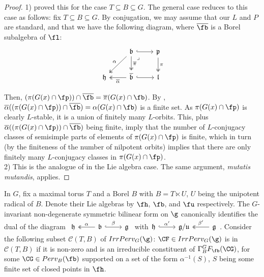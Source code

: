\begin{proof}
    1) \cite[]{mirkovic_character_2004} proved this for the case $T\subseteq B\subseteq G$. The general case reduces to this case as follows: fix $T\subseteq B\subseteq G$. By conjugation, we may assume that our $L$ and $P$ are standard, and that we have the following diagram, where $\overline{\fb}$ is a Borel subalgebra of $\fl$:
\[\begin{tikzcd}
	& {\mathfrak{b}} & {\mathfrak{p}} \\
	{\mathfrak{h}} & {\overline{\mathfrak{b}}} & {\mathfrak{l}}
	\arrow["{\overline{\pi}}", two heads, from=1-2, to=2-2]
	\arrow[hook, from=1-2, to=1-3]
	\arrow["\pi", two heads, from=1-3, to=2-3]
	\arrow[hook, from=2-2, to=2-3]
	\arrow["\lrcorner"{anchor=center, pos=0.125}, draw=none, from=1-2, to=2-3]
	\arrow["{\overline{\alpha}}", two heads, from=2-2, to=2-1]
	\arrow["\alpha"', two heads, from=1-2, to=2-1]
\end{tikzcd}\]

Then, $(\pi(G(x)\cap\fp))\cap\overline{\fb}=\overline{\pi}(G(x)\cap\fb)$. By \cite[]{mirkovic_character_2004}, $\overline{\alpha}((\pi(G(x)\cap\fp))\cap\overline{\fb})=\alpha(G(x)\cap\fb)$ is a finite set. As $\pi(G(x)\cap\fp)$ is clearly $L$-stable, it is a union of finitely many $L$-orbits. This, plus $\overline{\alpha}((\pi(G(x)\cap\fp))\cap\overline{\fb})$ being finite, imply that the number of $L$-conjugacy classes of semisimple parts of elements of $\pi(G(x)\cap\fp)$ is finite, which in turn (by the finiteness of the number of nilpotent orbits) implies that there are only finitely many $L$-conjugacy classes in $\pi(G(x)\cap\fp)$.\\

    2) This is the analogue of \cite[]{lusztig_intersection_1984} in the Lie algebra case. The same argument, \textit{mutatis mutandis}, applies.

\end{proof}

In $G$, fix a maximal torus $T$ and a Borel $B$ with $B=T\ltimes U$, $U$ being the unipotent radical of $B$. Denote their Lie algebras by $\fh$, $\fb$, and $\fu$ respectively. The $G$-invariant non-degenerate symmetric bilinear form on $\g$ canonically identifies the dual of the diagram $\begin{tikzcd}
	{\mathfrak{h}} & {\mathfrak{b}} & {\mathfrak{g}}
	\arrow["\alpha"', two heads, from=1-2, to=1-1]
	\arrow["\beta", hook, from=1-2, to=1-3]
\end{tikzcd}$ with$\begin{tikzcd}
	{\mathfrak{h}} & {\mathfrak{g}/\mathfrak{u}} & {\mathfrak{g}}
	\arrow["{\beta'}"', two heads, from=1-3, to=1-2]
	\arrow["{\alpha'}", hook, from=1-1, to=1-2]
\end{tikzcd}$. Consider the following subset $\mathcal{C}(T,B)$ of $IrrPerv_G(\g)$: $\CF\in IrrPerv_G(\g)$ is in $\mathcal{C}(T,B)$ if it is non-zero and is an irreducible constituent of $\Gamma^G_B F_{\fb}(\CG)$, for some $\CG\in Perv_B(\fb)$ supported on a set of the form $\alpha^{-1}(S)$, $S$ being some finite set of closed points in $\fh$. 

